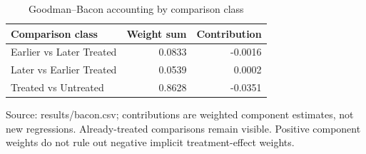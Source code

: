 \begin{table}[htbp]
\centering
\small
\caption{Goodman–Bacon accounting by comparison class}
\begin{tabularx}{\linewidth}{Xrr}
\toprule
Comparison class & Weight sum & Contribution \\
\midrule
Earlier vs Later Treated & 0.0833 & -0.0016 \\
Later vs Earlier Treated & 0.0539 & 0.0002 \\
Treated vs Untreated & 0.8628 & -0.0351 \\
\bottomrule
\end{tabularx}
\par\vspace{3pt}\begin{minipage}{\linewidth}\footnotesize Source: results/bacon.\allowbreak{}csv; contributions are weighted component estimates, not new regressions.\allowbreak{} Already-treated comparisons remain visible.\allowbreak{} Positive component weights do not rule out negative implicit treatment-effect weights.\allowbreak{}\end{minipage}
\end{table}
